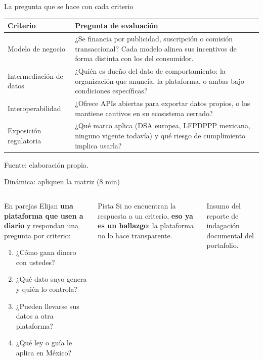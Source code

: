 \documentclass[aspectratio=169,xcolor=dvipsnames]{beamer}
\newcommand{\fuente}[1]{{\tiny\color{IPNgris}Fuente: #1}}
\begin{document}
\begin{frame}{La pregunta que se hace con cada criterio}
\footnotesize
\begin{center}
\begin{tabular}{@{}>{\raggedright}p{2.7cm}>{\raggedright\arraybackslash}p{9.6cm}@{}}
\toprule
\textbf{Criterio} & \textbf{Pregunta de evaluación} \\
\midrule
Modelo de negocio & ¿Se financia por publicidad, suscripción o comisión transaccional? Cada modelo alinea sus incentivos de forma distinta con los del consumidor. \\
Intermediación de datos & ¿Quién es dueño del dato de comportamiento: la organización que anuncia, la plataforma, o ambas bajo condiciones específicas? \\
Interoperabilidad & ¿Ofrece APIs abiertas para exportar datos propios, o los mantiene cautivos en su ecosistema cerrado? \\
Exposición regulatoria & ¿Qué marco aplica (DSA europea, LFPDPPP mexicana, ninguno vigente todavía) y qué riesgo de cumplimiento implica usarla? \\
\bottomrule
\end{tabular}
\end{center}
\fuente{elaboración propia.}
\end{frame}

\begin{frame}{Dinámica: apliquen la matriz (8 min)}
\begin{columns}[T]
  \begin{exampleblock}{En parejas}
    \small Elijan \textbf{una plataforma que usen a diario} y respondan una pregunta por criterio:
    \begin{enumerate}
      \scriptsize
      \item ¿Cómo gana dinero con ustedes?
      \item ¿Qué dato suyo genera y quién lo controla?
      \item ¿Pueden llevarse sus datos a otra plataforma?
      \item ¿Qué ley o guía le aplica en México?
    \end{enumerate}
  \end{exampleblock}
  \begin{alertblock}{Pista}
    \small Si no encuentran la respuesta a un criterio, \textbf{eso ya es un hallazgo}: la plataforma no lo hace transparente.
  \end{alertblock}
  {\small\color{IPNgris} Insumo del reporte de indagación documental del portafolio.}
\end{columns}
\end{frame}
\end{document}
